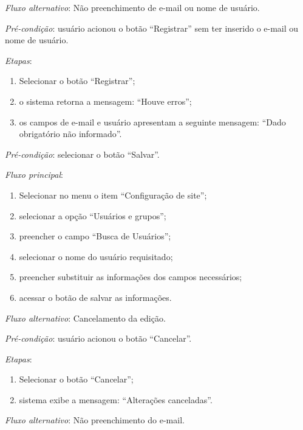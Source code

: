 \noindent \textit{Fluxo alternativo}: Não preenchimento de e-mail ou nome de usuário.

\noindent \textit{Pré-condição}: usuário acionou o botão ``Registrar'' sem ter inserido o e-mail ou nome de usuário.

\noindent \textit{Etapas}:

\begin{enumerate}
    \item Selecionar o botão ``Registrar'';
    \item o sistema retorna a mensagem: ``Houve erros'';
    \item os campos de e-mail e usuário apresentam a seguinte mensagem: ``Dado obrigatório não informado''.
\end{enumerate}




\vspace{0.7cm}

\noindent \textit{Pré-condição}: selecionar o botão ``Salvar''.

\noindent \textit{Fluxo principal}:

\begin{enumerate}
    \item Selecionar no menu o item ``Configuração de site'';
    \item selecionar a opção ``Usuários e grupos'';
    \item preencher o campo ``Busca de Usuários'';
    \item selecionar o nome do usuário requisitado;
    \item preencher substituir as informações dos campos necessários;
    \item acessar o botão de salvar as informações.
\end{enumerate}

\noindent \textit{Fluxo alternativo}: Cancelamento da edição.

\noindent \textit{Pré-condição}: usuário acionou o botão ``Cancelar''.

\noindent \textit{Etapas}:

\begin{enumerate}
    \item Selecionar o botão ``Cancelar'';
    \item sistema exibe a mensagem: ``Alterações canceladas''.
\end{enumerate}

\noindent \textit{Fluxo alternativo}: Não preenchimento do e-mail.

